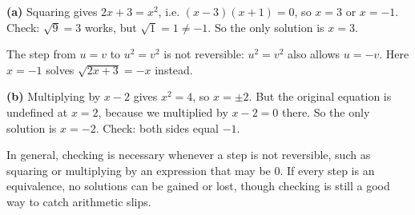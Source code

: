 \textbf{(a)} Squaring gives $2x+3=x^2$, i.e. $(x-3)(x+1)=0$, so $x=3$ or $x=-1$. Check: $\sqrt9=3$ works, but $\sqrt{1}=1\ne-1$. So the only solution is $\boxed{x=3}$.

The step from $u=v$ to $u^2=v^2$ is not reversible: $u^2=v^2$ also allows $u=-v$. Here $x=-1$ solves $\sqrt{2x+3}=-x$ instead.

\textbf{(b)} Multiplying by $x-2$ gives $x^2=4$, so $x=\pm2$. But the original equation is undefined at $x=2$, because we multiplied by $x-2=0$ there. So the only solution is $\boxed{x=-2}$. Check: both sides equal $-1$.

In general, checking is necessary whenever a step is not reversible, such as squaring or multiplying by an expression that may be $0$. If every step is an equivalence, no solutions can be gained or lost, though checking is still a good way to catch arithmetic slips.
